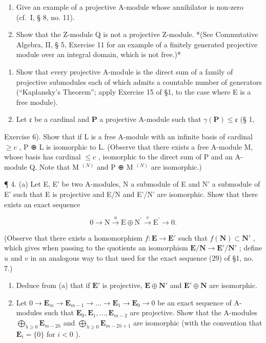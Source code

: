 \begin{enumerate}
\def\labelenumi{(\alph{enumi})}
\setcounter{enumi}{1}
\item
  Give an example of a projective A-module whose annihilator is non-zero (cf.~I, § 8, no. 11).
\item
  Show that the Z-module Q is not a projective Z-module. *(See Commutative Algebra, II, § 5, Exercise 11 for an example of a finitely generated projective module over an integral domain, which is not free.)*
\end{enumerate}

\begin{enumerate}
\def\labelenumi{\arabic{enumi}.}
\setcounter{enumi}{1}
\item
  Show that every projective A-module is the direct sum of a family of projective submodules each of which admits a countable number of generators (``Kaplansky's Theorem''; apply Exercise 15 of §1, to the case where E is a free module).
\item
  Let \(\mathfrak{c}\) be a cardinal and \(\mathbf{P}\) a projective A-module such that \(\gamma(\mathbf{P}) \leqslant \mathfrak{c}\) (§ 1,
\end{enumerate}

Exercise 6). Show that if L is a free A-module with an infinite basis of cardinal \(\geqslant c\) , P ⊕ L is isomorphic to L. (Observe that there exists a free A-module M, whose basis has cardinal \(\leqslant c\) , isomorphic to the direct sum of P and an A-module Q. Note that M \(^{(N)}\) and P ⊕ M \(^{(N)}\) are isomorphic.)

¶ 4. (a) Let E, E' be two A-modules, N a submodule of E and N' a submodule of E' such that E is projective and E/N and E'/N' are isomorphic. Show that there exists an exact sequence

\[
0 \longrightarrow \mathrm{N} \stackrel {u} {\longrightarrow} \mathrm{E} \oplus \mathrm{N} ^ {\prime} \stackrel {v} {\longrightarrow} \mathrm{E} ^ {\prime} \longrightarrow 0.
\]

(Observe that there exists a homomorphism \(f \colon \mathbf{E} \to \mathbf{E}'\) such that \(f(\mathbf{N}) \subset \mathbf{N}'\) , which gives when passing to the quotients an isomorphism \(\mathbf{E} / \mathbf{N} \to \mathbf{E}' / \mathbf{N}'\) ; define \(u\) and \(v\) in an analogous way to that used for the exact sequence (29) of §1, no. 7.)

\begin{enumerate}
\def\labelenumi{(\alph{enumi})}
\setcounter{enumi}{1}
\item
  Deduce from (a) that if \(\mathbf{E}'\) is projective, \(\mathbf{E} \oplus \mathbf{N}'\) and \(\mathbf{E}' \oplus \mathbf{N}\) are isomorphic.
\item
  Let \(0 \to \mathbf{E}_m \to \mathbf{E}_{m-1} \to \ldots \to \mathbf{E}_1 \to \mathbf{E}_0 \to 0\) be an exact sequence of A-modules such that \(\mathbf{E}_0, \mathbf{E}_1, \ldots, \mathbf{E}_{m-2}\) are projective. Show that the A-modules \(\bigoplus_{h \geqslant 0} \mathbf{E}_{m-2h}\) and \(\bigoplus_{h \geqslant 0} \mathbf{E}_{m-2h+1}\) are isomorphic (with the convention that \(\mathbf{E}_i = \{0\}\) for \(i < 0\) ).
\end{enumerate}

